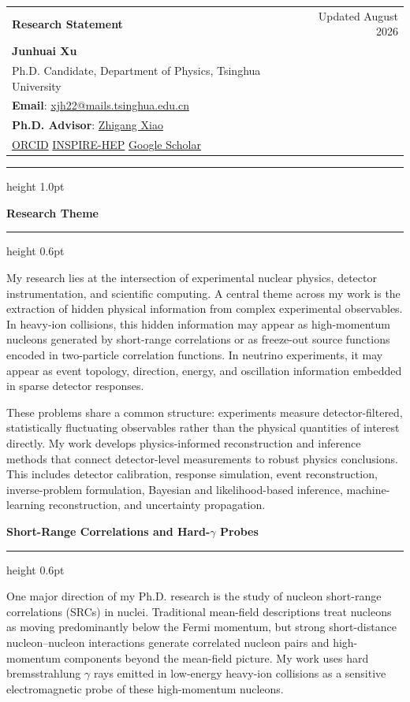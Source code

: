 \documentclass[10pt]{article}
\newcommand{\rssection}[1]{%
  \vspace{0.85em}
  {\large\bfseries\color{accent} #1}\par
  \vspace{0.2em}
  {\color{rule}\hrule height 0.6pt}
  \vspace{0.45em}
}
\newcommand{\bodypar}[1]{%
  {\normalsize #1\par}
  \vspace{0.58em}
}
\begin{document}
\pagestyle{empty}
\color{ink}

\begin{tabularx}{\linewidth}{@{}Xr@{}}
  {\LARGE\bfseries Research Statement} &
  {\small\color{muted}Updated August 2026} \\[0.48em]
  {\Large\bfseries Junhuai Xu} &
  {} \\
  {\normalsize Ph.D. Candidate, Department of Physics, Tsinghua University} &
  {} \\
  {\normalsize \textbf{Email}: \href{mailto:xjh22@mails.tsinghua.edu.cn}{xjh22@mails.tsinghua.edu.cn}} &
  {} \\
  {\normalsize \textbf{Ph.D. Advisor}: \href{https://inspirehep.net/authors/1062622}{Zhigang Xiao}} &
  {} \\
  {\normalsize \href{https://orcid.org/0000-0001-7529-8786}{ORCID} \quad \href{https://inspirehep.net/authors/1866896}{INSPIRE-HEP} \quad \href{https://scholar.google.com/citations?user=XK-LVeIAAAAJ\&hl=en}{Google Scholar}} &
  {}
\end{tabularx}

\vspace{0.65em}
{\color{accent}\hrule height 1.0pt}
\vspace{0.8em}

\rssection{Research Theme}
\bodypar{My research lies at the intersection of experimental nuclear physics, detector instrumentation, and scientific computing. A central theme across my work is the extraction of hidden physical information from complex experimental observables. In heavy-ion collisions, this hidden information may appear as high-momentum nucleons generated by short-range correlations or as freeze-out source functions encoded in two-particle correlation functions. In neutrino experiments, it may appear as event topology, direction, energy, and oscillation information embedded in sparse detector responses.}

\bodypar{These problems share a common structure: experiments measure detector-filtered, statistically fluctuating observables rather than the physical quantities of interest directly. My work develops physics-informed reconstruction and inference methods that connect detector-level measurements to robust physics conclusions. This includes detector calibration, response simulation, event reconstruction, inverse-problem formulation, Bayesian and likelihood-based inference, machine-learning reconstruction, and uncertainty propagation.}

\rssection{Short-Range Correlations and Hard-$\gamma$ Probes}
\bodypar{One major direction of my Ph.D. research is the study of nucleon short-range correlations (SRCs) in nuclei. Traditional mean-field descriptions treat nucleons as moving predominantly below the Fermi momentum, but strong short-distance nucleon--nucleon interactions generate correlated nucleon pairs and high-momentum components beyond the mean-field picture. My work uses hard bremsstrahlung $\gamma$ rays emitted in low-energy heavy-ion collisions as a sensitive electromagnetic probe of these high-momentum nucleons.}
\end{document}
